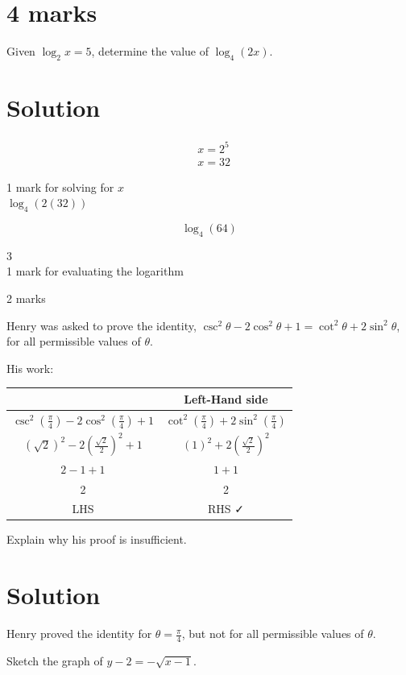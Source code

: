 \documentclass[10pt]{article}
\begin{document}
\section*{4 marks}
Given $\log _{2} x=5$, determine the value of $\log _{4}(2 x)$.

\section*{Solution}
$$
\begin{aligned}
& x=2^{5} \\
& x=32
\end{aligned}
$$

1 mark for solving for $x$\\
$\log _{4}(2(32))$

$$
\log _{4}(64)
$$

3\\
1 mark for evaluating the logarithm

2 marks

Henry was asked to prove the identity, $\csc ^{2} \theta-2 \cos ^{2} \theta+1=\cot ^{2} \theta+2 \sin ^{2} \theta$, for all permissible values of $\theta$.

His work:

\begin{center}
\begin{tabular}{c|c}
 & Left-Hand side \\
\hline
$\csc ^{2}\left(\frac{\pi}{4}\right)-2 \cos ^{2}\left(\frac{\pi}{4}\right)+1$ & $\cot ^{2}\left(\frac{\pi}{4}\right)+2 \sin ^{2}\left(\frac{\pi}{4}\right)$ \\
$(\sqrt{2})^{2}-2\left(\frac{\sqrt{2}}{2}\right)^{2}+1$ & $(1)^{2}+2\left(\frac{\sqrt{2}}{2}\right)^{2}$ \\
$2-1+1$ & $1+1$ \\
2 & 2 \\
LHS & RHS ✓ \\
\end{tabular}
\end{center}

Explain why his proof is insufficient.

\section*{Solution}
Henry proved the identity for $\theta=\frac{\pi}{4}$, but not for all permissible values of $\theta$.

Sketch the graph of $y-2=-\sqrt{x-1}$.
\end{document}
